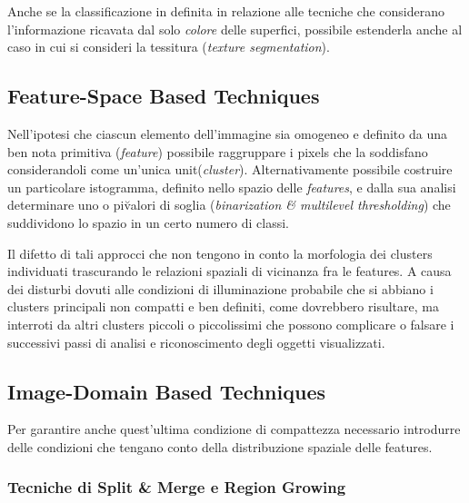 Anche se la classificazione in \cite{Lucchese} \e definita in relazione alle tecniche
che considerano l'informazione ricavata dal solo {\it colore} delle superfici, 
\e possibile estenderla anche al caso in cui si consideri la tessitura
({\it texture segmentation}).


\subsection{Feature-Space Based Techniques}

Nell'ipotesi che ciascun elemento dell'immagine sia omogeneo e definito da una ben nota
primitiva ({\it feature}) \e possibile raggruppare i pixels che la soddisfano considerandoli 
come un'unica unit\a ({\it cluster}).
Alternativamente \e possibile costruire un particolare istogramma, definito nello spazio
delle {\it features}, e dalla sua analisi determinare uno o pi\u valori di soglia 
({\it binarization \& multilevel thresholding}) che suddividono lo spazio in un certo
numero di classi.

Il difetto di tali approcci \e che non tengono in conto la morfologia dei clusters 
individuati trascurando le relazioni spaziali di vicinanza fra le features.
A causa dei disturbi dovuti alle condizioni di illuminazione \e probabile che si abbiano
i clusters principali non compatti e ben definiti, come dovrebbero risultare, ma interroti da
altri clusters piccoli o piccolissimi che possono complicare o falsare i successivi
passi di analisi e riconoscimento degli oggetti visualizzati.

\subsection{Image-Domain Based Techniques}

Per garantire anche quest'ultima condizione di compattezza \e necessario introdurre delle 
condizioni che tengano conto della distribuzione spaziale delle features.

\subsubsection{Tecniche di Split \& Merge e Region Growing}

